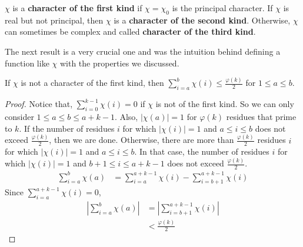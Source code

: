 \documentclass[elemannt.tex]{subfile}
\begin{document}
		\begin{definition}
			$\chi$ is a \textbf{character of the first kind} if $\chi=\chi_{0}$ is the principal character. If $\chi$ is real but not principal, then $\chi$ is a \textbf{character of the second kind}. Otherwise, $\chi$ can sometimes be complex and called \textbf{character of the third kind}.
		\end{definition}
	The next result is a very crucial one and was the intuition behind defining a function like $\chi$ with the properties we discussed.
		\begin{proposition}
			If $\chi$ is not a character of the first kind, then $\sum_{i=a}^{b}\chi(i)\leq \frac{\varphi(k)}{2}$ for $1\leq a\leq b$.
		\end{proposition}

		\begin{proof}
			Notice that, $\sum_{i=0}^{k-1}\chi(i)=0$ if $\chi$ is not of the first kind. So we can only consider $1\leq a\leq b\leq a+k-1$. Also, $|\chi(a)|=1$ for $\varphi(k)$ residues that prime to $k$. If the number of residues $i$ for which $|\chi(i)|=1$ and $a\leq i\leq b$ does not exceed $\frac{\varphi(k)}{2}$, then we are done. Otherwise, there are more than $\frac{\varphi(k)}{2}$ residues $i$ for which $|\chi(i)|=1$ and $a\leq i\leq b$. In that case, the number of residues $i$ for which $|\chi(i)|=1$ and $b+1\leq i\leq a+k-1$ does not exceed $\frac{\varphi(k)}{2}$.
				\begin{align*}
					\sum_{i=a}^{b}\chi(a)
						& = \sum_{i=a}^{a+k-1}\chi(i)-\sum_{i=b+1}^{a+k-1}\chi(i)
				\end{align*}
			Since $\sum_{i=a}^{a+k-1}\chi(i)=0$,
				\begin{align*}
					\left|\sum_{i=a}^{b}\chi(a)\right|
						& = \left|\sum_{i=b+1}^{a+k-1}\chi(i)\right|\\
						& < \frac{\varphi(k)}{2}
				\end{align*}
		\end{proof}
\end{document}
